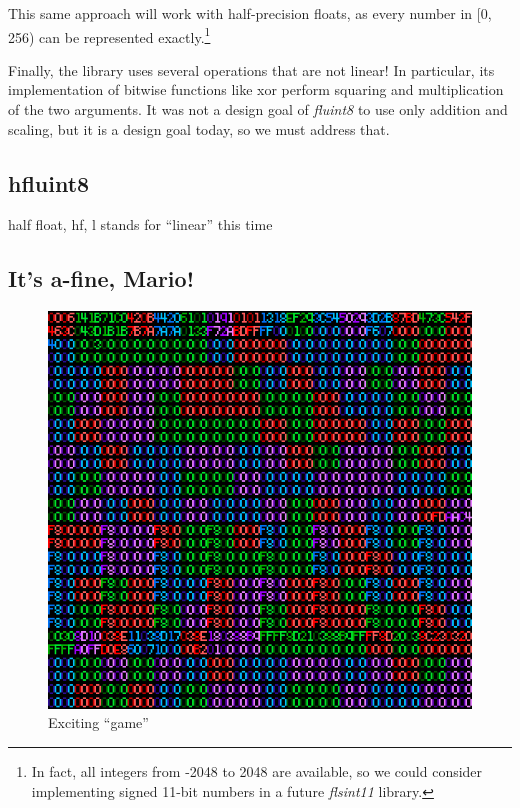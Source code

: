 \documentclass[twocolumn]{article}
\newcommand\comment[1]{}
\begin{document}
This same approach will work with half-precision floats, as every
number in [0, 256) can be represented exactly.\footnote{In fact, all
    integers from -2048 to 2048 are available, so we could consider
    implementing signed 11-bit numbers in a future {\it flsint11}
    library.}

Finally, the library uses several operations that are not linear!
In particular, its implementation of bitwise functions like xor
perform squaring and multiplication of the two arguments. It
was not a design goal of {\it fluint8} to use only addition and
scaling, but it is a design goal today, so we must address that.

\subsection{hfluint8}

half float, hf, l stands for ``linear'' this time

\comment{ OK! Summary to self for later: The tricks in the fluint8
  paper work for integral values, just like my fluint8.h. The graphs
  are a bit misleading in this sense. In particular (see old.cc), the
  endpoints of the intervals for the fmod function are

\begin{lstlisting}
 c3800000 -> c3800000 (-256 -> -256)
 bf000080 -> 00000000 (-0.50000762939 -> 0)
 437f8001 -> 43800000 (255.50001526 -> 256)
 43ffc000 -> 44000000 (511.5 -> 512)
\end{lstlisting}

So it works great for its purpose, but not if we insist on intervals like [0, 0.125).
}

\subsection{It's a-fine, Mario!}

\begin{figure}[htp]
  \begin{center}
    \includegraphics[width=0.9 \linewidth]{testrom}
  \end{center}
  \caption{
    Exciting ``game''
  } \label{fig:testrom}
\end{figure}
\end{document}
